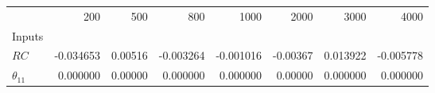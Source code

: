 \begin{tabular}{lrrrrrrr}
\toprule
{} &      200  &     500  &      800  &      1000 &     2000 &      3000 &      4000 \\
Inputs        &           &          &           &           &          &           &           \\
\midrule
$RC$          & -0.034653 &  0.00516 & -0.003264 & -0.001016 & -0.00367 &  0.013922 & -0.005778 \\
$\theta_{11}$ &  0.000000 &  0.00000 &  0.000000 &  0.000000 &  0.00000 &  0.000000 &  0.000000 \\
\bottomrule
\end{tabular}
